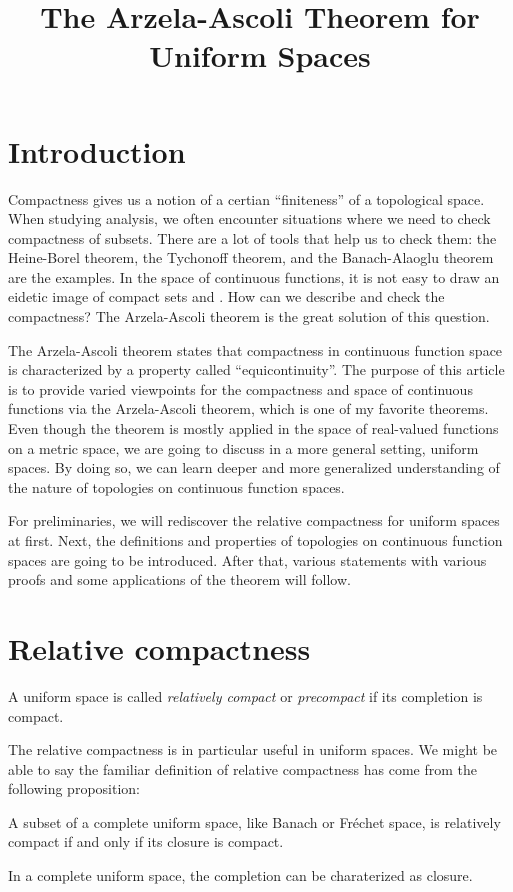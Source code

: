 \documentclass{../exp}
\title{The Arzela-Ascoli Theorem for Uniform Spaces}
\begin{document}
\maketitle

\section{Introduction}
Compactness gives us a notion of a certian ``finiteness'' of a topological space.
When studying analysis, we often encounter situations where we need to check compactness of subsets.
There are a lot of tools that help us to check them: the Heine-Borel theorem, the Tychonoff theorem, and the Banach-Alaoglu theorem are the examples.
In the space of continuous functions, it is not easy to draw an eidetic image of compact sets and .
How can we describe and check the compactness?
The Arzela-Ascoli theorem is the great solution of this question.

The Arzela-Ascoli theorem states that compactness in continuous function space is characterized by a property called ``equicontinuity''.
The purpose of this article is to provide varied viewpoints for the compactness and space of continuous functions via the Arzela-Ascoli theorem, which is one of my favorite theorems.
Even though the theorem is mostly applied in the space of real-valued functions on a metric space, we are going to discuss in a more general setting, uniform spaces.
By doing so, we can learn deeper and more generalized understanding of the nature of topologies on continuous function spaces.

For preliminaries, we will rediscover the relative compactness for uniform spaces at first.
Next, the definitions and properties of topologies on continuous function spaces are going to be introduced.
After that, various statements with various proofs and some applications of the theorem will follow.




\section{Relative compactness}

\begin{defn}
A uniform space is called \emph{relatively compact} or \emph{precompact} if its completion is compact.
\end{defn}

The relative compactness is in particular useful in uniform spaces.
We might be able to say the familiar definition of relative compactness has come from the following proposition:
\begin{prop}
A subset of a complete uniform space, like Banach or Fr\'echet space, is relatively compact if and only if its closure is compact.
\end{prop}
\begin{pf}
In a complete uniform space, the completion can be charaterized as closure.
\end{pf}
\end{document}
